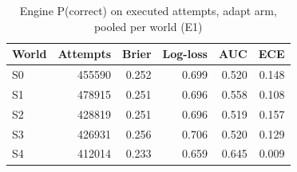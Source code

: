 \begin{table}[htbp]
\centering\small
\caption{Engine P(correct) on executed attempts, adapt arm, pooled per world (E1)}
\label{tab:t6b}
\begin{tabular}{lrrrrr}
\toprule
World & Attempts & Brier & Log-loss & AUC & ECE \\
\midrule
S0 & 455590 & 0.252 & 0.699 & 0.520 & 0.148 \\
S1 & 478915 & 0.251 & 0.696 & 0.558 & 0.108 \\
S2 & 428819 & 0.251 & 0.696 & 0.519 & 0.157 \\
S3 & 426931 & 0.256 & 0.706 & 0.520 & 0.129 \\
S4 & 412014 & 0.233 & 0.659 & 0.645 & 0.009 \\
\bottomrule
\end{tabular}
\end{table}
